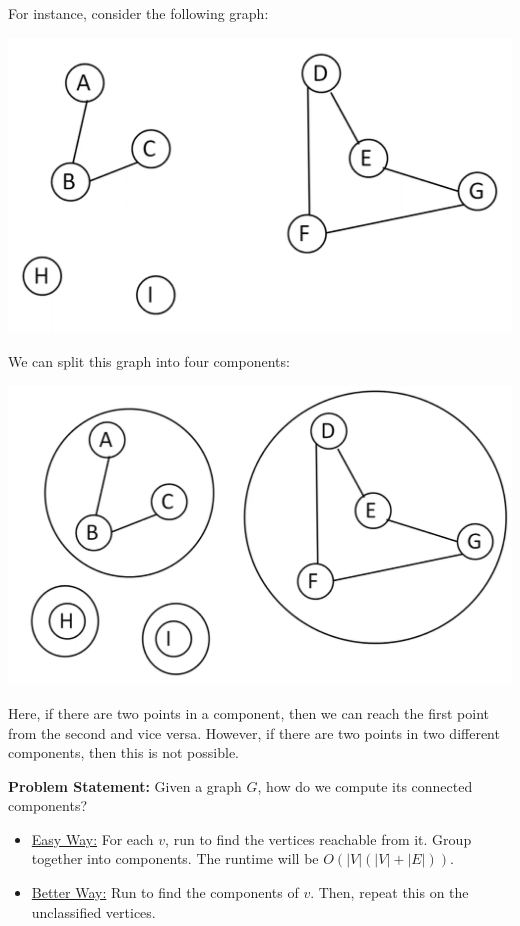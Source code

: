 \documentclass[letterpaper]{article}
\begin{document}
For instance, consider the following graph:
\begin{center}
    \includegraphics[scale=0.35]{assets/graph_con.png}
\end{center}
We can split this graph into four components: 
\begin{center}
    \includegraphics[scale=0.35]{assets/graph_con_2.png}
\end{center}
Here, if there are two points in a component, then we can reach the first point from the second and vice versa. However, if there are two points in two different components, then this is not possible.  

\bigskip 

\textbf{Problem Statement:} Given a graph $G$, how do we compute its connected components? 
\begin{itemize}
    \item \underline{Easy Way:} For each $v$, run  to find the vertices reachable from it. Group together into components. The runtime will be $O(|V|(|V| + |E|))$. 
    \item \underline{Better Way:} Run  to find the components of $v$. Then, repeat this on the unclassified vertices. 
\end{itemize}
\end{document}
